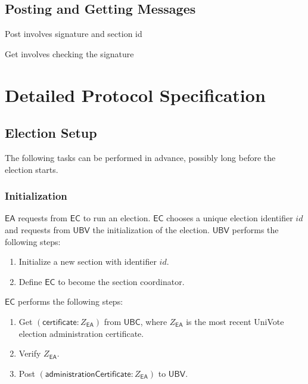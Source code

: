 \documentclass[bibtotoc,halfparskip,oneside]{scrreprt}
\newcommand{\eid}{\mathit{id}\xspace}
\newcommand{\EA}{\ensuremath{\mathsf{EA}}\xspace}
\newcommand{\EC}{\ensuremath{\mathsf{EC}}\xspace}
\newcommand{\UBC}{\ensuremath{\mathsf{UBC}}\xspace}
\newcommand{\UBV}{\ensuremath{\mathsf{UBV}}\xspace}
\begin{document}
	\subsection{Posting and Getting Messages}
	
	Post involves signature and section id
	
	Get involves checking the signature
	
	\section{Detailed Protocol Specification}
	
	
	
	\subsection{Election Setup}
	
	The following tasks can be performed in advance, possibly long before the election starts.
	
	\subsubsection{Initialization}
	
	\EA requests from \EC to run an election. \EC chooses a unique election identifier $\eid$ and requests from \UBV the initialization of the election. \UBV performs the following steps: 
	\begin{enumerate}
		\item Initialize a new section with identifier $\eid$.
		\item Define \EC to become the section coordinator.
	\end{enumerate}
	
	\EC performs the following steps: 
	\begin{enumerate}[resume]
		\item Get $(\textsf{certificate}:Z_{\EA})$ from \UBC, where $Z_{\EA}$ is the most recent UniVote election administration certificate.
		\item Verify $Z_{\EA}$.
		\item Post $(\mathsf{administrationCertificate}: Z_{\EA})$ to \UBV.
	\end{enumerate}
	
\end{document}
